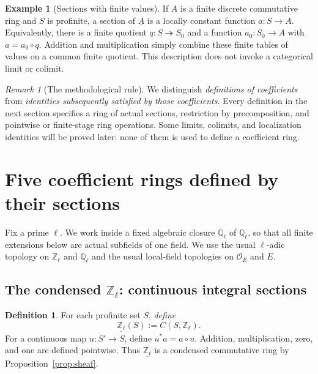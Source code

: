 \documentclass[11pt,a4paper]{article}
\numberwithin{equation}{section}
\theoremstyle{definition}
\newtheorem{definition}[theorem]{Definition}
\newtheorem{example}[theorem]{Example}
\theoremstyle{remark}
\newtheorem{remark}[theorem]{Remark}
\newcommand{\OO}{\mathcal O}
\newcommand{\ringunder}[1]{\underline{#1}}
\newcommand{\Qlbar}{\overline{\mathbb Q}_{\ell}}
\begin{document}
\begin{example}[Sections with finite values]\label{ex:finite-test}
If $A$ is a finite discrete commutative ring and $S$ is profinite, a
section of $\ringunder A$ is a locally constant function $a:S\to A$.
Equivalently, there is a finite quotient $q:S\twoheadrightarrow S_0$
and a function $a_0:S_0\to A$ with $a=a_0\circ q$.  Addition and
multiplication simply combine these finite tables of values on a common
finite quotient.  This description does not invoke a categorical
limit or colimit.
\end{example}

\begin{remark}[The methodological rule]
We distinguish \emph{definitions of coefficients} from \emph{identities
subsequently satisfied by those coefficients}.  Every definition in the
next section specifies a ring of actual sections, restriction by
precomposition, and pointwise or finite-stage ring operations.  Some
limits, colimits, and localization identities will be proved later;
none of them is used to define a coefficient ring.
\end{remark}

\section{Five coefficient rings defined by their sections}

Fix a prime $\ell$.  We work inside a fixed algebraic closure
$\Qlbar$ of $\mathbb Q_\ell$, so that all finite extensions below are
actual subfields of one field.  We use the usual $\ell$-adic topology
on $\mathbb Z_\ell$ and $\mathbb Q_\ell$ and the usual local-field
topologies on $\OO_E$ and $E$.

\subsection{\texorpdfstring{The condensed $\mathbb Z_\ell$}{The condensed Zl}: continuous integral sections}

\begin{definition}\label{def:Zl}
For each profinite set $S$, \emph{define}
\begin{equation}\label{eq:Zl-def}
  \boxed{\quad \ringunder{\mathbb Z_\ell}(S):=C(S,\mathbb Z_\ell).\quad}
\end{equation}
For a continuous map $u:S'\to S$, define $u^*a=a\circ u$.
Addition, multiplication, zero, and one are defined pointwise.  Thus
$\ringunder{\mathbb Z_\ell}$ is a condensed commutative ring by
Proposition~\ref{prop:sheaf}.
\end{definition}
\end{document}

